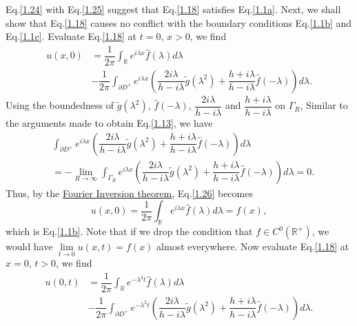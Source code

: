 \documentclass[12pt]{article}
\numberwithin{equation}{section}
\begin{document}
Eq.\eqref{1.24} with Eq.\eqref{1.25} suggest that Eq.\eqref{1.18} satisfies Eq.\eqref{1.1a}. Next, we shall show that Eq.\eqref{1.18} causes no conflict with the boundary conditions Eq.\eqref{1.1b} and Eq.\eqref{1.1c}.
Evaluate Eq.\eqref{1.18} at $t=0$, $x>0$, we find
\begin{equation}\label{1.26}
    \begin{split}
        u(x,0)&=\dfrac{1}{2\pi}\int_{\mathbb{R}}e^{i\lambda x}\hat{f}(\lambda)d\lambda\\
        &-\dfrac{1}{2\pi} \int_{\partial D^+} e^{i\lambda x}\left(\dfrac{2i\lambda}{h-i\lambda}\tilde{g}(\lambda^2)+\dfrac{h+i\lambda}{h-i\lambda}\hat{f}(-\lambda)\right) d\lambda.
    \end{split}
\end{equation}
Using the boundedness of $\tilde{g}(\lambda^2)$, $\hat{f}(-\lambda)$, $\dfrac{2i\lambda}{h-i\lambda}$ and $\dfrac{h+i\lambda}{h-i\lambda}$ on $\Gamma_{R}$, Similar to the arguments made to obtain Eq.\eqref{1.13}, we have
\begin{equation}
    \begin{split}
        &\int_{\partial D^+} e^{i\lambda x}\left(\dfrac{2i\lambda}{h-i\lambda}\tilde{g}(\lambda^2)+\dfrac{h+i\lambda}{h-i\lambda}\hat{f}(-\lambda)\right) d\lambda\\
        &=-\lim\limits_{R\to\infty} \int_{\Gamma_{R}} e^{i\lambda x}\left(\dfrac{2i\lambda}{h-i\lambda}\tilde{g}(\lambda^2)+\dfrac{h+i\lambda}{h-i\lambda}\hat{f}(-\lambda)\right) d\lambda=0.
    \end{split}
\end{equation}
Thus, by the \href{https://w.wiki/9av5}{Fourier Inversion theorem}, Eq.\eqref{1.26} becomes
\begin{equation}
    u(x,0)=\dfrac{1}{2\pi}\int_{\mathbb{R}}e^{i\lambda x}\hat{f}(\lambda)d\lambda=f(x),
\end{equation}
which is Eq.\eqref{1.1b}. Note that if we drop the condition that $f\in C^{0}(\mathbb{R}^+)$, we would have $\lim\limits_{t\to 0}u(x,t)=f(x)$ almost everywhere. Now evaluate Eq.\eqref{1.18} at $x=0$, $t>0$, we find
\begin{equation}\label{1.29}
    \begin{split}
        u(0,t)&=\dfrac{1}{2\pi}\int_{\mathbb{R}}e^{-\lambda^2 t}\hat{f}(\lambda)d\lambda\\
        &-\dfrac{1}{2\pi} \int_{\partial D^+} e^{-\lambda^2 t}\left(\dfrac{2i\lambda}{h-i\lambda}\tilde{g}(\lambda^2)+\dfrac{h+i\lambda}{h-i\lambda}\hat{f}(-\lambda)\right) d\lambda.
    \end{split}
\end{equation}
\end{document}
